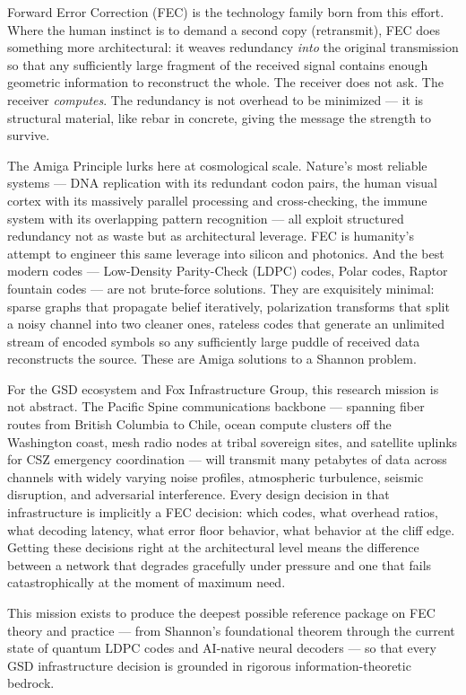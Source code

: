 \documentclass[11pt,letterpaper]{article}
\begin{document}
Forward Error Correction (FEC) is the technology family born from this effort. Where the human instinct is to demand a second copy (retransmit), FEC does something more architectural: it weaves redundancy \textit{into} the original transmission so that any sufficiently large fragment of the received signal contains enough geometric information to reconstruct the whole. The receiver does not ask. The receiver \textit{computes}. The redundancy is not overhead to be minimized --- it is structural material, like rebar in concrete, giving the message the strength to survive.

The Amiga Principle lurks here at cosmological scale. Nature's most reliable systems --- DNA replication with its redundant codon pairs, the human visual cortex with its massively parallel processing and cross-checking, the immune system with its overlapping pattern recognition --- all exploit structured redundancy not as waste but as architectural leverage. FEC is humanity's attempt to engineer this same leverage into silicon and photonics. And the best modern codes --- Low-Density Parity-Check (LDPC) codes, Polar codes, Raptor fountain codes --- are not brute-force solutions. They are exquisitely minimal: sparse graphs that propagate belief iteratively, polarization transforms that split a noisy channel into two cleaner ones, rateless codes that generate an unlimited stream of encoded symbols so any sufficiently large puddle of received data reconstructs the source. These are Amiga solutions to a Shannon problem.

For the GSD ecosystem and Fox Infrastructure Group, this research mission is not abstract. The Pacific Spine communications backbone --- spanning fiber routes from British Columbia to Chile, ocean compute clusters off the Washington coast, mesh radio nodes at tribal sovereign sites, and satellite uplinks for CSZ emergency coordination --- will transmit many petabytes of data across channels with widely varying noise profiles, atmospheric turbulence, seismic disruption, and adversarial interference. Every design decision in that infrastructure is implicitly a FEC decision: which codes, what overhead ratios, what decoding latency, what error floor behavior, what behavior at the cliff edge. Getting these decisions right at the architectural level means the difference between a network that degrades gracefully under pressure and one that fails catastrophically at the moment of maximum need.

This mission exists to produce the deepest possible reference package on FEC theory and practice --- from Shannon's foundational theorem through the current state of quantum LDPC codes and AI-native neural decoders --- so that every GSD infrastructure decision is grounded in rigorous information-theoretic bedrock.
\end{document}
